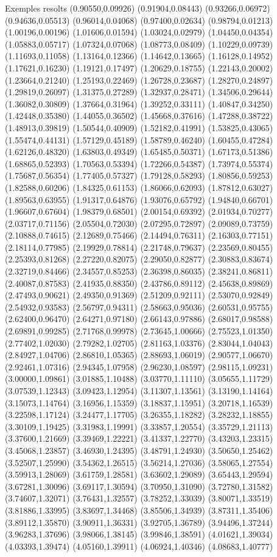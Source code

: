 \documentclass[11pt,a4paper]{article}
\begin{document}
\begin{fmex}{Exemples resolts}
(0.90550,0.09926) (0.91904,0.08443) (0.93266,0.06972) (0.94636,0.05513) (0.96014,0.04068) (0.97400,0.02634) (0.98794,0.01213) (1.00196,0.00196) (1.01606,0.01594) (1.03024,0.02979) (1.04450,0.04354) (1.05883,0.05717) (1.07324,0.07068) (1.08773,0.08409) (1.10229,0.09739) (1.11693,0.11058) (1.13164,0.12366) (1.14642,0.13665) (1.16128,0.14952) (1.17621,0.16230) (1.19121,0.17497) (1.20629,0.18755) (1.22143,0.20002) (1.23664,0.21240) (1.25193,0.22469) (1.26728,0.23687) (1.28270,0.24897) (1.29819,0.26097) (1.31375,0.27289) (1.32937,0.28471) (1.34506,0.29644) (1.36082,0.30809) (1.37664,0.31964) (1.39252,0.33111) (1.40847,0.34250) (1.42448,0.35380) (1.44055,0.36502) (1.45668,0.37616) (1.47288,0.38722) (1.48913,0.39819) (1.50544,0.40909) (1.52182,0.41991) (1.53825,0.43065) (1.55474,0.44131) (1.57129,0.45189) (1.58789,0.46240) (1.60455,0.47284) (1.62126,0.48320) (1.63803,0.49349) (1.65485,0.50371) (1.67173,0.51386) (1.68865,0.52393) (1.70563,0.53394) (1.72266,0.54387) (1.73974,0.55374) (1.75687,0.56354) (1.77405,0.57327) (1.79128,0.58293) (1.80856,0.59253) (1.82588,0.60206) (1.84325,0.61153) (1.86066,0.62093) (1.87812,0.63027) (1.89563,0.63955) (1.91317,0.64876) (1.93076,0.65792) (1.94840,0.66701) (1.96607,0.67604) (1.98379,0.68501) (2.00154,0.69392) (2.01934,0.70277) (2.03717,0.71156) (2.05504,0.72030) (2.07295,0.72897) (2.09089,0.73759) (2.10888,0.74615) (2.12689,0.75466) (2.14494,0.76311) (2.16303,0.77151) (2.18114,0.77985) (2.19929,0.78814) (2.21748,0.79637) (2.23569,0.80455) (2.25393,0.81268) (2.27220,0.82075) (2.29050,0.82877) (2.30883,0.83674) (2.32719,0.84466) (2.34557,0.85253) (2.36398,0.86035) (2.38241,0.86811) (2.40087,0.87583) (2.41935,0.88350) (2.43786,0.89112) (2.45638,0.89869) (2.47493,0.90621) (2.49350,0.91369) (2.51209,0.92111) (2.53070,0.92849) (2.54932,0.93583) (2.56797,0.94311) (2.58663,0.95036) (2.60531,0.95755) (2.62400,0.96470) (2.64271,0.97180) (2.66143,0.97886) (2.68017,0.98588) (2.69891,0.99285) (2.71768,0.99978) (2.73645,1.00666) (2.75523,1.01350) (2.77402,1.02030) (2.79282,1.02705) (2.81163,1.03376) (2.83044,1.04043) (2.84927,1.04706) (2.86810,1.05365) (2.88693,1.06019) (2.90577,1.06670) (2.92461,1.07316) (2.94345,1.07958) (2.96230,1.08597) (2.98115,1.09231) (3.00000,1.09861) (3.01885,1.10488) (3.03770,1.11110) (3.05655,1.11729) (3.07539,1.12343) (3.09423,1.12954) (3.11307,1.13561) (3.13190,1.14164) (3.15073,1.14764) (3.16956,1.15359) (3.18837,1.15951) (3.20718,1.16539) (3.22598,1.17124) (3.24477,1.17705) (3.26355,1.18282) (3.28232,1.18855) (3.30109,1.19425) (3.31983,1.19991) (3.33857,1.20554) (3.35729,1.21113) (3.37600,1.21669) (3.39469,1.22221) (3.41337,1.22770) (3.43203,1.23315) (3.45068,1.23857) (3.46930,1.24395) (3.48791,1.24930) (3.50650,1.25462) (3.52507,1.25990) (3.54362,1.26515) (3.56214,1.27036) (3.58065,1.27554) (3.59913,1.28069) (3.61759,1.28581) (3.63602,1.29089) (3.65443,1.29594) (3.67281,1.30096) (3.69117,1.30594) (3.70950,1.31090) (3.72780,1.31582) (3.74607,1.32071) (3.76431,1.32557) (3.78252,1.33039) (3.80071,1.33519) (3.81886,1.33995) (3.83697,1.34468) (3.85506,1.34939) (3.87311,1.35406) (3.89112,1.35870) (3.90911,1.36331) (3.92705,1.36789) (3.94496,1.37244) (3.96283,1.37696) (3.98066,1.38145) (3.99846,1.38591) (4.01621,1.39034) (4.03393,1.39474) (4.05160,1.39911) (4.06924,1.40346) (4.08683,1.40777) 
\end{fmex}
\end{document}
